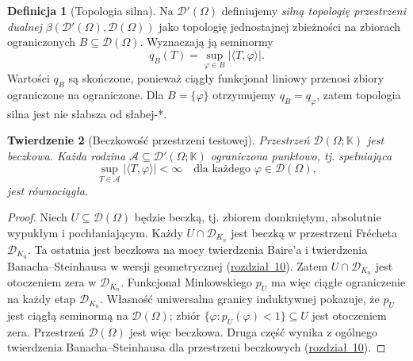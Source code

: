 \documentclass[11pt,a4paper]{article}
\numberwithin{equation}{section}
\theoremstyle{plain}
\newtheorem{twierdzenie}{Twierdzenie}[section]
\theoremstyle{definition}
\newtheorem{definicja}[twierdzenie]{Definicja}
\theoremstyle{remark}
\newcommand{\K}{\mathbb K}
\begin{document}
\begin{definicja}[Topologia silna]
\label{def:strong19}
Na $\mathcal D'(\Omega)$ definiujemy
\emph{silną topologię przestrzeni dualnej}
$\beta(\mathcal D'(\Omega),\mathcal D(\Omega))$
jako topologię jednostajnej zbieżności na zbiorach
ograniczonych $B\subseteq\mathcal D(\Omega)$.
Wyznaczają ją seminormy
\[q_B(T)=\sup_{\varphi\in B}|\langle T,\varphi\rangle|.\]
Wartości $q_B$ są skończone, ponieważ ciągły funkcjonał
liniowy przenosi zbiory ograniczone na ograniczone.
Dla $B=\{\varphi\}$ otrzymujemy $q_B=q_\varphi$,
zatem topologia silna jest nie słabsza od słabej-*.
\end{definicja}

\begin{twierdzenie}[Beczkowość przestrzeni testowej]
\label{thm:D-barrelled19}
Przestrzeń $\mathcal D(\Omega;\K)$ jest beczkowa.
Każda rodzina $\mathcal A\subseteq\mathcal D'(\Omega;\K)$
ograniczona punktowo, tj. spełniająca
\[\sup_{T\in\mathcal A}|\langle T,\varphi\rangle|<\infty
\quad\text{dla każdego }\varphi\in\mathcal D(\Omega),\]
jest równociągła.
\end{twierdzenie}
\begin{proof}
Niech $U\subseteq\mathcal D(\Omega)$ będzie
beczką, tj. zbiorem domkniętym, absolutnie wypukłym
i pochłaniającym. Każdy $U\cap\mathcal D_{K_n}$ jest
beczką w przestrzeni Fr\'echeta $\mathcal D_{K_n}$.
Ta ostatnia jest beczkowa na mocy twierdzenia Baire'a
i twierdzenia Banacha--Steinhausa w wersji geometrycznej
(\hyperref[sec:beczkowe-bornologiczne]{rozdział~10}). Zatem
$U\cap\mathcal D_{K_n}$ jest otoczeniem zera
w $\mathcal D_{K_n}$.
Funkcjonał Minkowskiego $p_U$ ma więc ciągłe ograniczenie
na każdy etap $\mathcal D_{K_n}$. Własność uniwersalna
granicy induktywnej pokazuje, że $p_U$ jest ciągłą
seminormą na $\mathcal D(\Omega)$; zbiór
$\{\varphi:p_U(\varphi)<1\}\subseteq U$ jest otoczeniem
zera. Przestrzeń $\mathcal D(\Omega)$ jest więc beczkowa.
Druga część wynika z ogólnego twierdzenia
Banacha--Steinhausa dla przestrzeni beczkowych
(\hyperref[sec:beczkowe-bornologiczne]{rozdział~10}).
\end{proof}
\end{document}
